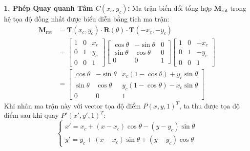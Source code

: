 \textbf{1. Phép Quay quanh Tâm $C(x_c, y_c)$:}
Ma trận biến đổi tổng hợp $\mathbf{M}_{\text{rot}}$ trong hệ tọa độ đồng nhất được biểu diễn bằng tích ma trận:
\begin{align}
\label{eq:rotate_pivot_composite}
\mathbf{M}_{\text{rot}} &= \mathbf{T}(x_c, y_c) \cdot \mathbf{R}(\theta) \cdot \mathbf{T}(-x_c, -y_c) \nonumber \\
&= \begin{bmatrix} 1 & 0 & x_c \\ 0 & 1 & y_c \\ 0 & 0 & 1 \end{bmatrix} \begin{bmatrix} \cos\theta & -\sin\theta & 0 \\ \sin\theta & \cos\theta & 0 \\ 0 & 0 & 1 \end{bmatrix} \begin{bmatrix} 1 & 0 & -x_c \\ 0 & 1 & -y_c \\ 0 & 0 & 1 \end{bmatrix} \nonumber \\
&= \begin{bmatrix} \cos\theta & -\sin\theta & x_c(1 - \cos\theta) + y_c\sin\theta \\ \sin\theta & \cos\theta & y_c(1 - \cos\theta) - x_c\sin\theta \\ 0 & 0 & 1 \end{bmatrix}
\end{align}
Khi nhân ma trận này với vector tọa độ điểm $P(x, y, 1)^T$, ta thu được tọa độ điểm sau khi quay $P'(x', y', 1)^T$:
\begin{equation}
\label{eq:rotate_pivot_explicit}
\begin{cases}
x' = x_c + (x - x_c)\cos\theta - (y - y_c)\sin\theta \\
y' = y_c + (x - x_c)\sin\theta + (y - y_c)\cos\theta
\end{cases}
\end{equation}

